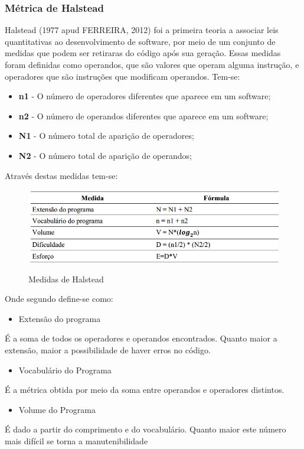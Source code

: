 \subsubsection{Métrica de Halstead}
Halstead (1977 apud FERREIRA, 2012) foi a primeira teoria a associar leis quantitativas ao desenvolvimento de software, por meio de um conjunto de medidas que podem ser retiraras do código após sua geração. Essas medidas foram definidas como operandos, que são valores  que operam alguma instrução, e operadores que são instruções que modificam operandos. Tem-se:
\begin{itemize}
\item \textbf{n1} - O número de operadores diferentes que aparece em um software;
\end{itemize}
\begin{itemize}
\item \textbf{n2} - O número de operandos diferentes que aparece em um software;
\end{itemize}
\begin{itemize}
\item \textbf{N1} - O número total de aparição de operadores;
\end{itemize}
\begin{itemize}
\item \textbf{N2} - O número total de aparição de operandos;
\end{itemize}

Através destas medidas tem-se:
\begin{figure}[tbh]
\centering
\caption[Medidas de Halstead]{Medidas de Halstead}
\includegraphics[width=0.7\linewidth]{./images/volumedehalshead}
\label{fig:Halstead}
\end{figure}

Onde segundo  define-se como:
\begin{itemize}
\item Extensão  do  programa
\end{itemize}
É a soma de todos os operadores e operandos encontrados. Quanto maior a extensão, maior a possibilidade de haver erros no código.
\begin{itemize}
\item Vocabulário do Programa
\end{itemize}
É a métrica obtida por meio da soma entre operandos e operadores distintos. 
\begin{itemize}
\item Volume do Programa
\end{itemize}
É dado a partir do comprimento e do vocabulário. Quanto maior este número mais difícil se torna a manutenibilidade

